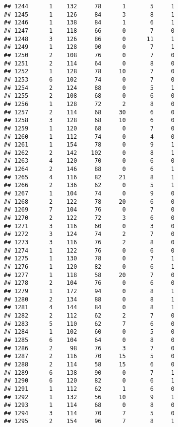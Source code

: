 \documentclass[
]{article}
\begin{document}
\begin{verbatim}
## 1244      1    132     78      1       5     1
## 1245      1    126     84      3       8     1
## 1246      1    138     84      1       6     1
## 1247      1    118     66      0       7     0
## 1248      3    126     86      0      11     1
## 1249      1    128     90      0       7     1
## 1250      2    108     76      0       7     0
## 1251      2    114     64      0       8     0
## 1252      1    128     78     10       7     0
## 1253      6    102     74      0       7     0
## 1254      2    124     88      0       5     1
## 1255      2    108     68      0       6     0
## 1256      1    128     72      2       8     0
## 1257      2    114     68     30       6     0
## 1258      3    128     68     10       6     0
## 1259      1    120     68      0       7     0
## 1260      1    112     74      0       4     0
## 1261      1    154     78      0       9     1
## 1262      2    142    102      0       8     1
## 1263      4    120     70      0       6     0
## 1264      2    146     88      0       6     1
## 1265      4    116     82     21       8     1
## 1266      2    136     62      0       5     1
## 1267      1    104     74      0       9     0
## 1268      2    122     78     20       6     0
## 1269      7    104     76      0       7     0
## 1270      2    122     72      3       6     0
## 1271      3    116     60      0       3     0
## 1272      3    124     74      2       7     0
## 1273      3    116     76      2       8     0
## 1274      1    122     76      0       6     0
## 1275      1    130     78      0       7     1
## 1276      1    120     82      0       6     1
## 1277      1    118     58     20       7     0
## 1278      2    104     76      0       6     0
## 1279      1    172     94      0       8     1
## 1280      2    134     88      0       8     1
## 1281      4    144     84      0       8     1
## 1282      2    112     62      2       7     0
## 1283      5    110     62      7       6     0
## 1284      1    102     60      0       5     0
## 1285      6    104     64      0       8     0
## 1286      2     98     76      3       7     0
## 1287      2    116     70     15       5     0
## 1288      2    114     58     15       6     0
## 1289      6    138     90      0       7     1
## 1290      6    120     82      0       6     1
## 1291      1    112     62      1       6     0
## 1292      1    132     56     10       9     1
## 1293      1    114     68      0       8     0
## 1294      3    114     70      7       5     0
## 1295      2    154     96      7       8     1

\end{verbatim}
\end{document}
